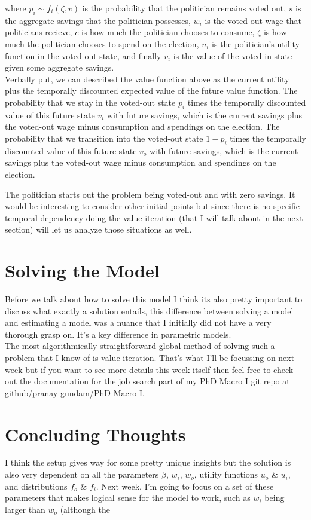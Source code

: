 \documentclass[11pt,english]{article}
\begin{document}
\begin{itemize}
where $p_i \sim f_i(\zeta, v)$ is the probability that the politician remains voted out, $s$ is the aggregate savings that the politician possesses, $w_i$ is the voted-out wage that politicians recieve, $c$ is how much the politician chooses to consume, $\zeta$ is how much the politician chooses to spend on the election, $u_i$ is the politician's utility function in the voted-out state, and finally $v_i$ is the value of the voted-in state given some aggregate savings.\\

\noindent Verbally put, we can described the value function above as the current utility plus the temporally discounted expected value of the future value function. The probability that we stay in the voted-out state $p_i$ times the temporally discounted value of this future state $v_i$ with future savings, which is the current savings plus the voted-out wage minus consumption and spendings on the election. The probability that we transition into the voted-out state $1-p_i$ times the temporally discounted value of this future state $v_o$ with future savings, which is the current savings plus the voted-out wage minus consumption and spendings on the election.

\end{itemize}

\noindent The politician starts out the problem being voted-out and with zero savings. It would be interesting to consider other initial points but since there is no specific temporal dependency doing the value iteration (that I will talk about in the next section) will let us analyze those situations as well.

\section*{Solving the Model}

Before we talk about how to solve this model I think its also pretty important to discuss what exactly a solution entails, this difference between solving a model and estimating a model was a nuance that I initially did not have a very thorough grasp on. It's a key difference in parametric models.\\

\noindent The most algorithmically straightforward global method of solving such a problem that I know of is value iteration. That's what I'll be focussing on next week but if you want to see more details this week itself then feel free to check out the documentation for the job search part of my PhD Macro I git repo at \href{https://github.com/pranay-gundam/PhDMacro-I}{github/pranay-gundam/PhD-Macro-I}.

\section*{Concluding Thoughts}

I think the setup gives way for some pretty unique insights but the solution is also very dependent on all the parameters $\beta$, $w_i$, $w_o$, utility functions $u_o$ \& $u_i$, and distributions $f_o$ \& $f_i$. Next week, I'm going to focus on a set of these parameters that makes logical sense for the model to work, such as $w_i$ being larger than $w_o$ (although the 
\end{document}
